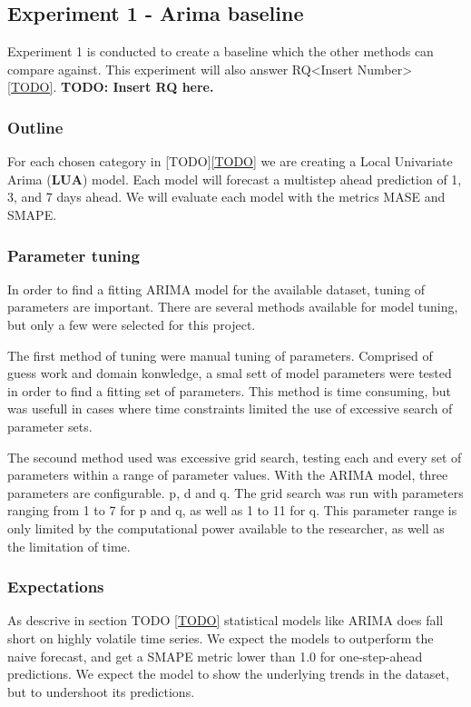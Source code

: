 
\subsection{Experiment 1 - Arima baseline}
\label{section:Method:Experiment1-Arima}

Experiment 1 is conducted to create a baseline which
the other methods can compare against. This experiment will also
answer RQ<Insert Number> \cref{TODO}.
\textbf{TODO: Insert RQ here.}

\subsubsection{Outline}
For each chosen category in [TODO]\cref{TODO} we are creating a Local Univariate Arima (\textbf{LUA})
model. Each model will forecast a multistep ahead prediction of 1, 3, and 7 days ahead.
We will evaluate each model with the metrics MASE and SMAPE.


\subsubsection{Parameter tuning}
\label{section:Method:Arima:Tuning}
In order to find a fitting ARIMA model for the available dataset, tuning of parameters are important.
There are several methods available for model tuning, but only a few were selected for this project.

The first method of tuning were manual tuning of parameters.
Comprised of guess work and domain konwledge, a smal sett of model parameters were tested in order to find a fitting set of parameters.
This method is time consuming, but was usefull in cases where time constraints limited the use of excessive search of parameter sets.

The secound method used was excessive grid search, testing each and every set of parameters within a range of parameter values.
With the ARIMA model, three parameters are configurable. p, d and q.
The grid search was run with parameters ranging from 1 to 7 for p and q, as well as 1 to 11 for q.
This parameter range is only limited by the computational power available to the researcher, as well as the limitation of time.


\subsubsection{Expectations}
As descrive in section TODO \cref{TODO} statistical models like ARIMA does
fall short on highly volatile time series.
We expect the models to outperform the naive forecast, and get a SMAPE metric
lower than 1.0 for one-step-ahead predictions.
We expect the model to show the underlying trends in the dataset, but to
undershoot its predictions.

